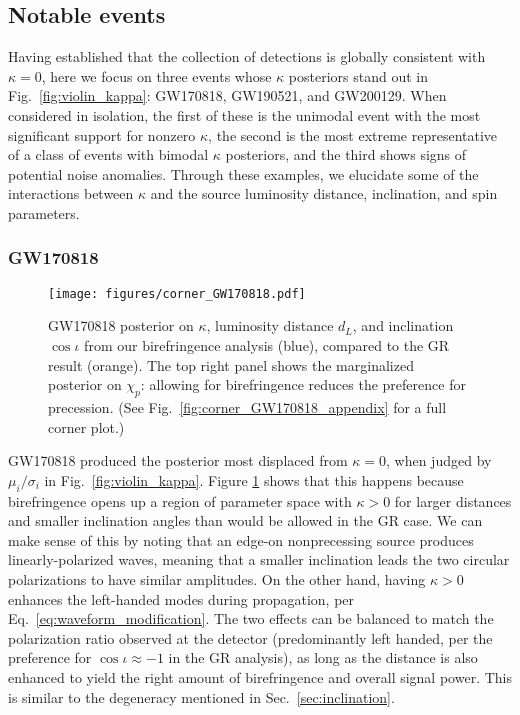 \documentclass[aps,prd,twocolumn,superscriptaddress,preprintnumbers,nofootinbib]{revtex4-2}
\begin{document}
\subsection{Notable events}
\label{sec:results:notable}

Having established that the collection of detections is globally consistent with $\kappa=0$, here we focus on three events whose $\kappa$ posteriors stand out in Fig.~\ref{fig:violin_kappa}: GW170818, GW190521, and GW200129.
When considered in isolation, the first of these is the unimodal event with the most significant support for nonzero $\kappa$, the second is the most extreme representative of a class of events with bimodal $\kappa$ posteriors, and the third shows signs of potential noise anomalies.
Through these examples, we elucidate some of the interactions between $\kappa$ and the source luminosity distance, inclination, and spin parameters.

\subsubsection{GW170818}
\label{sec:GW170818}

\begin{figure}
    \texttt{[image: figures/corner\_GW170818.pdf]}
    \caption{
        GW170818 posterior on $\kappa$, luminosity distance $d_L$, and inclination $\cos\iota$ from our birefringence analysis (blue), compared to the GR result (orange).
        The top right panel shows the marginalized posterior on $\chi_p$: allowing for birefringence reduces the preference for precession. (See Fig.~\ref{fig:corner_GW170818_appendix} for a full corner plot.)
    }
    \label{fig:corner_GW170818}
\end{figure}

GW170818 produced the posterior most displaced from $\kappa=0$, when judged by $\mu_i/\sigma_i$ in Fig.~\ref{fig:violin_kappa}.
Figure \ref{fig:corner_GW170818} shows that this happens because birefringence opens up a region of parameter space with $\kappa>0$ for larger distances and smaller inclination angles than would be allowed in the GR case.
We can make sense of this by noting that an edge-on nonprecessing source produces linearly-polarized waves, meaning that a smaller inclination leads the two circular polarizations to have similar amplitudes.
On the other hand, having $\kappa > 0$ enhances the left-handed modes during propagation, per Eq.~\eqref{eq:waveform_modification}.
The two effects can be balanced to match the polarization ratio observed at the detector (predominantly left handed, per the preference for $\cos\iota \approx -1$ in the \ac{GR} analysis), as long as the distance is also enhanced to yield the right amount of birefringence and overall signal power.
This is similar to the degeneracy mentioned in Sec.~\ref{sec:inclination}.
\end{document}
